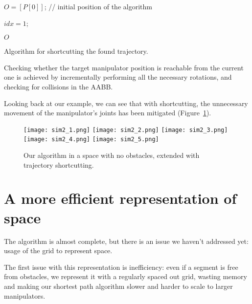 \begin{algorithm}

 $O = [P[0]]$; // initial position of the algorithm

 $idx = 1$;


\Return $O$\;

\caption{Algorithm for shortcutting the found trajectory.}\label{alg:opt}
\end{algorithm}

Checking whether the target manipulator position is reachable from the current one is achieved by incrementally performing all the necessary rotations, and checking for collisions in the AABB.

Looking back at our example, we can see that with shortcutting, the unnecessary movement of the manipulator's joints has been mitigated (Figure~\ref{fig:sim2}).

\begin{figure}[h]
  \centering
  \begin{minipage}{\textwidth}
    \texttt{[image: sim2\_1.png]}
    \texttt{[image: sim2\_2.png]}
    \texttt{[image: sim2\_3.png]}
    \texttt{[image: sim2\_4.png]}
    \texttt{[image: sim2\_5.png]}
  \end{minipage}
  \caption{Our algorithm in a space with no obstacles, extended with trajectory shortcutting.}\label{fig:sim2}
\end{figure}

\clearpage

\section{A more efficient representation of space}

The algorithm is almost complete, but there is an issue we haven't addressed yet: usage of the grid to represent space.

The first issue with this representation is inefficiency: even if a segment is free from obstacles, we represent it with a regularly spaced out grid, wasting memory and making our shortest path algorithm slower and harder to scale to larger manipulators.

